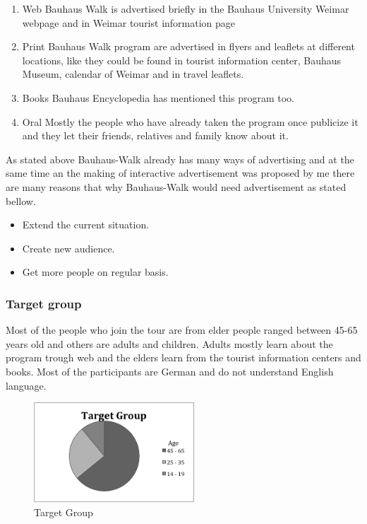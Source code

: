 \begin {enumerate}

\item	Web
Bauhaus Walk is advertised briefly in the Bauhaus University Weimar webpage \cite{Tourist_info} and in Weimar tourist information page \cite{Bauhaus_Walk_Uni}

\item	Print
Bauhaus Walk program are advertised in flyers and leaflets at different locations, like they could be found in tourist information center, Bauhaus Museum, calendar of Weimar and in travel leaflets. 

\item	Books
Bauhaus Encyclopedia has mentioned this program too. 

\item	Oral
Mostly the people who have already taken the program once publicize it and they let their friends, relatives and family know about it.


\end{enumerate}

As stated above Bauhaus-Walk already has many ways of advertising and at the same time an the making of interactive advertisement was proposed by me there are many reasons that why Bauhaus-Walk would need advertisement as stated bellow.


\begin {itemize}
\item   Extend the current situation.
\item	Create new audience.
\item	Get more people on regular basis.
\end{itemize}


\subsubsection{Target group}

Most of the people who join the tour are from elder people ranged between 45-65 years old and others are adults and children. Adults mostly learn about the program trough web and the elders learn from the tourist information centers and books.  Most of the participants are German and do not understand English language.

\begin{figure}[H]
    \centering
    \includegraphics[width=6cm]{Figures/4/target_group}%
    \caption{Target Group}%
    \label{fig:target_group}%
\end{figure}


